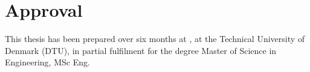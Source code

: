 \section*{Approval}
This thesis has been prepared over six months at \departmentdescriber, at the
Technical University of Denmark (DTU), in partial fulfilment for the degree
Master of Science in Engineering, MSc Eng.

\vfill

\begin{center}
\namesigdate{\thesisauthor~-~\studentnumber}
\end{center}

\vfill
